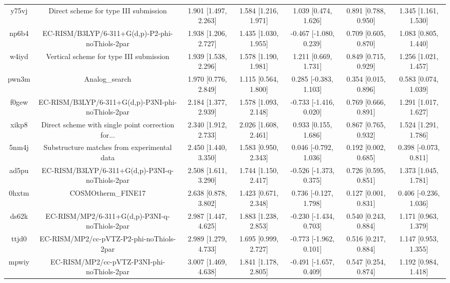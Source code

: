 \documentclass{article}
\begin{document}
\begin{center}
\begin{longtable}{|ccccccc|}
 y75vj &              Direct scheme for type III submission &  1.901 [1.497, 2.263] &  1.584 [1.216, 1.971] &     1.039 [0.474, 1.626] &  0.891 [0.788, 0.950] &   1.345 [1.161, 1.530] \\
 np6b4 &    EC-RISM/B3LYP/6-311+G(d,p)-P2-phi-noThiols-2par &  1.938 [1.206, 2.727] &  1.435 [1.030, 1.955] &   -0.467 [-1.080, 0.239] &  0.709 [0.605, 0.870] &   1.083 [0.805, 1.440] \\
 w4iyd &            Vertical scheme for type III submission &  1.939 [1.538, 2.296] &  1.578 [1.190, 1.981] &     1.211 [0.669, 1.731] &  0.849 [0.715, 0.929] &   1.256 [1.021, 1.457] \\
 pwn3m &                                     Analog\_search &  1.970 [0.776, 2.849] &  1.115 [0.564, 1.800] &    0.285 [-0.383, 1.103] &  0.354 [0.015, 0.896] &   0.583 [0.074, 1.039] \\
 f0gew &  EC-RISM/B3LYP/6-311+G(d,p)-P3NI-phi-noThiols-2par &  2.184 [1.377, 2.939] &  1.578 [1.093, 2.148] &   -0.733 [-1.416, 0.020] &  0.769 [0.666, 0.891] &   1.291 [1.017, 1.627] \\
 xikp8 &  Direct scheme with single point correction for... &  2.340 [1.912, 2.733] &  2.026 [1.608, 2.461] &     0.933 [0.155, 1.686] &  0.867 [0.765, 0.932] &   1.524 [1.291, 1.786] \\
 5nm4j &        Substructure matches from experimental data &  2.450 [1.440, 3.350] &  1.583 [0.950, 2.343] &    0.046 [-0.792, 1.036] &  0.192 [0.002, 0.685] &  0.398 [-0.073, 0.811] \\
 ad5pu &    EC-RISM/B3LYP/6-311+G(d,p)-P3NI-q-noThiols-2par &  2.508 [1.611, 3.290] &  1.744 [1.150, 2.417] &   -0.526 [-1.373, 0.375] &  0.726 [0.595, 0.851] &   1.373 [1.045, 1.781] \\
 0hxtm &                                 COSMOtherm\_FINE17 &  2.638 [0.878, 3.802] &  1.423 [0.671, 2.348] &    0.736 [-0.127, 1.798] &  0.127 [0.001, 0.831] &  0.406 [-0.236, 1.036] \\
 ds62k &      EC-RISM/MP2/6-311+G(d,p)-P3NI-q-noThiols-2par &  2.987 [1.447, 4.625] &  1.883 [1.238, 2.853] &   -0.230 [-1.434, 0.703] &  0.540 [0.243, 0.884] &   1.171 [0.963, 1.379] \\
 ttjd0 &           EC-RISM/MP2/cc-pVTZ-P2-phi-noThiols-2par &  2.989 [1.279, 4.733] &  1.695 [0.999, 2.727] &   -0.773 [-1.962, 0.101] &  0.516 [0.217, 0.884] &   1.147 [0.953, 1.355] \\
 mpwiy &         EC-RISM/MP2/cc-pVTZ-P3NI-phi-noThiols-2par &  3.007 [1.469, 4.638] &  1.841 [1.178, 2.805] &   -0.491 [-1.657, 0.409] &  0.547 [0.254, 0.874] &   1.192 [0.984, 1.418] \\

\end{longtable}
\end{center}
\end{document}
